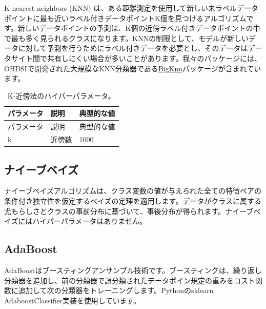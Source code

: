 \documentclass[
  11pt]{book}
\theoremstyle{definition}
\theoremstyle{definition}
\theoremstyle{definition}
\theoremstyle{definition}
\theoremstyle{remark}
\begin{document}
K-nearest neighbors (KNN) は、ある距離測定を使用して新しい未ラベルデータポイントに最も近いラベル付きデータポイントK個を見つけるアルゴリズムです。新しいデータポイントの予測は、K個の近傍ラベル付きデータポイントの中で最も多く見られるクラスになります。KNNの制限として、モデルが新しいデータに対して予測を行うためにラベル付きデータを必要とし、そのデータはデータサイト間で共有しにくい場合が多いことがあります。我々のパッケージには、OHDSIで開発された大規模なKNN分類器である\href{https://github.com/OHDSI/BigKnn}{BigKnn}パッケージが含まれています。  

\begin{longtable}[]{@{}lll@{}}
\caption{\label{tab:knnParameters} K-近傍法のハイパーパラメータ。}\tabularnewline
\toprule\noalign{}
パラメータ & 説明 & 典型的な値 \\
\midrule\noalign{}
\endfirsthead
\toprule\noalign{}
パラメータ & 説明 & 典型的な値 \\
\midrule\noalign{}
\endhead
\bottomrule\noalign{}
\endlastfoot
k & 近傍数 & 1000 \\
\end{longtable}

\subsection{ナイーブベイズ}\label{ux30caux30a4ux30fcux30d6ux30d9ux30a4ux30ba}

ナイーブベイズアルゴリズムは、クラス変数の値が与えられた全ての特徴ペアの条件付き独立性を仮定するベイズの定理を適用します。データがクラスに属する尤もらしさとクラスの事前分布に基づいて、事後分布が得られます。ナイーブベイズにはハイパーパラメータはありません。 

\subsection{AdaBoost}\label{adaboost}

AdaBoostはブースティングアンサンブル技術です。ブースティングは、繰り返し分類器を追加し、前の分類器で誤分類されたデータポイン規定の重みをコスト関数に追加して次の分類器をトレーニングします。Pythonのsklearn AdaboostClassifier実装を使用しています。  
\end{document}
